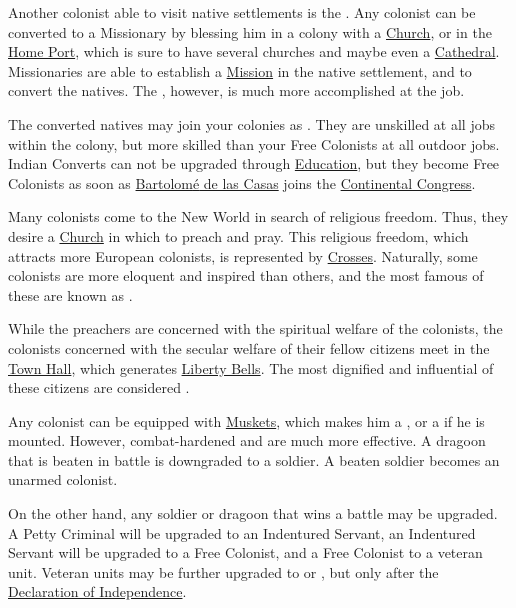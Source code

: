 \documentclass[12pt]{book}
\begin{document}
Another colonist able to visit native settlements is the
. Any colonist can be converted to a Missionary by
blessing him in a colony with a \hyperlink{Church}{Church}, or in the
\hyperlink{Home Port}{Home Port}, which is sure to have several
churches and maybe even a
\hyperlink{Cathedral}{Cathedral}. Missionaries are able to establish a
\hyperlink{Mission}{Mission} in the native settlement, and to convert
the natives. The , however, is much more
accomplished at the job.

The converted natives may join your colonies as . They are unskilled at all jobs within the colony, but more
skilled than your Free Colonists at all outdoor jobs. Indian Converts
can not be upgraded through \hyperlink{Skills and
Education}{Education}, but they become Free Colonists as soon as
\hyperlink{Bartolome de las Casas}{Bartolom{\'e} de las Casas} joins
the \hyperlink{Continental Congress}{Continental Congress}.

Many colonists come to the New World in search of religious
freedom. Thus, they desire a \hyperlink{Church}{Church} in which to
preach and pray. This religious freedom, which attracts more European
colonists, is represented by \hyperlink{Crosses}{Crosses}. Naturally,
some colonists are more eloquent and inspired than others, and the
most famous of these are known as .

While the preachers are concerned with the spiritual welfare of the
colonists, the colonists concerned with the secular welfare of their
fellow citizens meet in the \hyperlink{Town Hall}{Town Hall}, which
generates \hyperlink{Liberty Bells}{Liberty Bells}. The most dignified
and influential of these citizens are considered .

Any colonist can be equipped with \hyperlink{Muskets}{Muskets}, which
makes him a , or a  if he is
mounted. However, combat-hardened  and
 are much more effective. A dragoon that is
beaten in battle is downgraded to a soldier. A beaten soldier becomes
an unarmed colonist.

On the other hand, any soldier or dragoon that wins a battle may be
upgraded. A Petty Criminal will be upgraded to an Indentured Servant,
an Indentured Servant will be upgraded to a Free Colonist, and a Free
Colonist to a veteran unit. Veteran units may be further upgraded to
 or , but only after the
\hyperlink{Declaration of Independence}{Declaration of Independence}.
\end{document}
